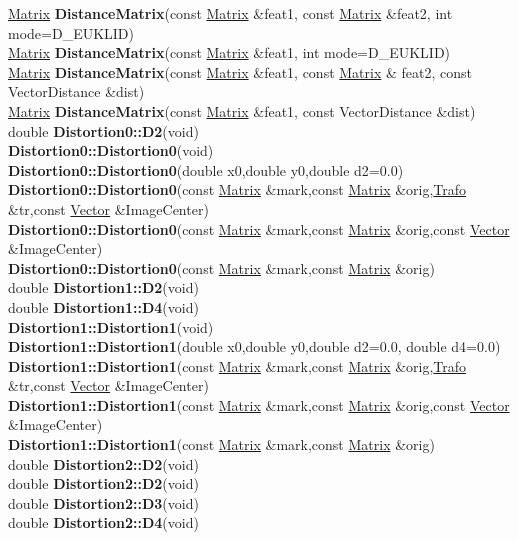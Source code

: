 \documentclass[10pt,titlepage]{article}
\def\functionlistentry#1#2#3#4#5#6{\noindent #1 {\bf #2}(#3) \dotfill #6\\}
\begin{document}
{{\functionlistentry{\hyperlink{Matrix}{Matrix}}{DistanceMatrix}{const \hyperlink{Matrix}{Matrix} \&feat1, const \hyperlink{Matrix}{Matrix} \&feat2, int mode=D\_EUKLID}{1239}{features}{}
\functionlistentry{\hyperlink{Matrix}{Matrix}}{DistanceMatrix}{const \hyperlink{Matrix}{Matrix} \&feat1, int mode=D\_EUKLID}{1240}{features}{}
\functionlistentry{\hyperlink{Matrix}{Matrix}}{DistanceMatrix}{const \hyperlink{Matrix}{Matrix} \&feat1, const \hyperlink{Matrix}{Matrix} \& feat2, const VectorDistance \&dist}{1241}{features}{}
\functionlistentry{\hyperlink{Matrix}{Matrix}}{DistanceMatrix}{const \hyperlink{Matrix}{Matrix} \&feat1, const VectorDistance \&dist}{1242}{features}{}
\functionlistentry{double}{Distortion0::D2}{void}{750}{geoTrafo}{}
\functionlistentry{}{Distortion0::Distortion0}{void}{728}{geoTrafo}{}
\functionlistentry{}{Distortion0::Distortion0}{double x0,double y0,double d2=0.0}{732}{geoTrafo}{}
\functionlistentry{}{Distortion0::Distortion0}{const \hyperlink{Matrix}{Matrix} \&mark,const \hyperlink{Matrix}{Matrix} \&orig,\hyperlink{Trafo}{Trafo} \&tr,const \hyperlink{Vector}{Vector} \&ImageCenter}{736}{geoTrafo}{}
\functionlistentry{}{Distortion0::Distortion0}{const \hyperlink{Matrix}{Matrix} \&mark,const \hyperlink{Matrix}{Matrix} \&orig,const \hyperlink{Vector}{Vector} \&ImageCenter}{737}{geoTrafo}{}
\functionlistentry{}{Distortion0::Distortion0}{const \hyperlink{Matrix}{Matrix} \&mark,const \hyperlink{Matrix}{Matrix} \&orig}{738}{geoTrafo}{}
\functionlistentry{double}{Distortion1::D2}{void}{751}{geoTrafo}{}
\functionlistentry{double}{Distortion1::D4}{void}{752}{geoTrafo}{}
\functionlistentry{}{Distortion1::Distortion1}{void}{729}{geoTrafo}{}
\functionlistentry{}{Distortion1::Distortion1}{double x0,double y0,double d2=0.0, double d4=0.0}{733}{geoTrafo}{}
\functionlistentry{}{Distortion1::Distortion1}{const \hyperlink{Matrix}{Matrix} \&mark,const \hyperlink{Matrix}{Matrix} \&orig,\hyperlink{Trafo}{Trafo} \&tr,const \hyperlink{Vector}{Vector} \&ImageCenter}{739}{geoTrafo}{}
\functionlistentry{}{Distortion1::Distortion1}{const \hyperlink{Matrix}{Matrix} \&mark,const \hyperlink{Matrix}{Matrix} \&orig,const \hyperlink{Vector}{Vector} \&ImageCenter}{740}{geoTrafo}{}
\functionlistentry{}{Distortion1::Distortion1}{const \hyperlink{Matrix}{Matrix} \&mark,const \hyperlink{Matrix}{Matrix} \&orig}{741}{geoTrafo}{}
\functionlistentry{double}{Distortion2::D2}{void}{753}{geoTrafo}{}
\functionlistentry{double}{Distortion2::D2}{void}{756}{geoTrafo}{}
\functionlistentry{double}{Distortion2::D3}{void}{754}{geoTrafo}{}
\functionlistentry{double}{Distortion2::D4}{void}{755}{geoTrafo}{}
}}
\end{document}
